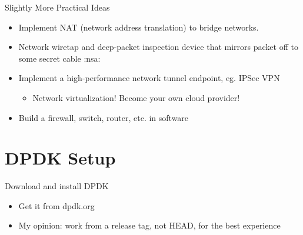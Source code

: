 \documentclass[presentation]{beamer}
\begin{document}
\begin{frame}[label={sec:org4b2ed3c}]{Slightly More Practical Ideas}
\begin{itemize}
\item Implement NAT (network address translation) to bridge networks.
\item Network wiretap and deep-packet inspection device that mirrors
packet off to some secret cable :nsa:
\item Implement a high-performance network tunnel endpoint, eg. IPSec
VPN
\begin{itemize}
\item Network virtualization! Become your own cloud provider!
\end{itemize}
\item Build a firewall, switch, router, etc. in software
\end{itemize}
\end{frame}

\section{DPDK Setup}
\label{sec:org6a198c2}
\begin{frame}[label={sec:org5a66088}]{Download and install DPDK}
\begin{itemize}
\item Get it from dpdk.org
\item My opinion: work from a release tag, not HEAD, for the best experience
\end{itemize}
\end{frame}
\end{document}
